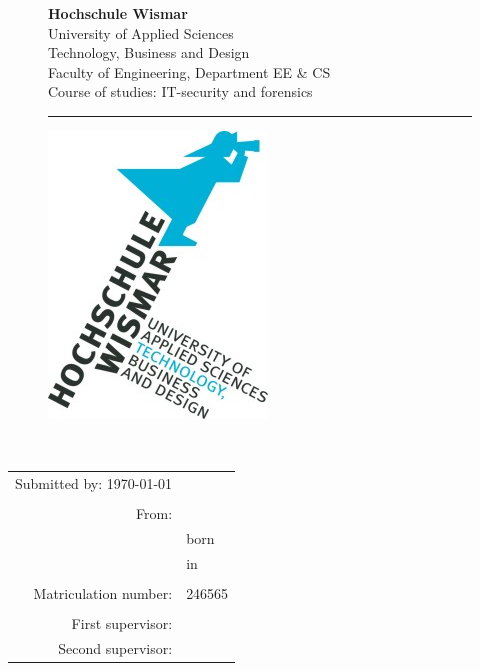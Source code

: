 \begin{titlepage}
	\setlength\headsep{-5mm}
	\begin{figure}[!h]
		\begin{minipage}{0.8\textwidth}
			\textbf{Hochschule Wismar} \\
			University of Applied Sciences \\
			Technology, Business and Design \\
			Faculty of Engineering, Department EE \&{} CS \\
			Course of studies: IT-security and forensics\\
		\rule{\textwidth}{0.5pt}
		\end{minipage}
		\begin{minipage}[r]{0.1\textwidth}
			\begin{flushright}
				\includegraphics[height=6\baselineskip]{pics/HSLogo.jpg}
			\end{flushright}
		\end{minipage}
	\end{figure}
	\vspace*{6cm}
	\begin{center}
		\Huge
		\textbf{\documentType} \\
		\vspace{2cm}
		\large \thetitle
		\begin{table}[b]
			\begin{tabular}{rl}
				Submitted by: \today \\
				\\
				From: & \theauthor \\
				& born \birthday \\
				& in \birthplace \\
				\\
				Matriculation number: & 246565 \\
				\\
				First supervisor: & \firstTutor \\
				Second supervisor: & \secondTutor
			\end{tabular}
		\end{table}
	\end{center}
\end{titlepage}